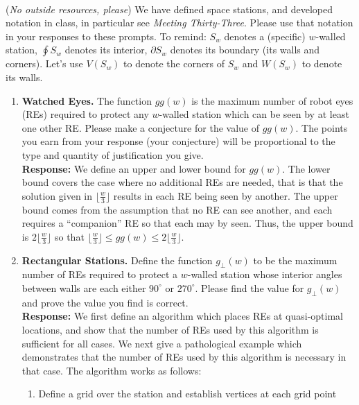 \documentclass{article}
\newcommand{\response}[1]{\leavevmode\\[0.05in]{\bf Response: } #1 \leavevmode\\[0.05in]}
\begin{document}
\noindent \underline{\hspace{5in}}
\vspace{2em}
\\
\noindent(\emph{No outside resources, please}) We have defined space stations, and developed notation in class, in particular see \emph{Meeting Thirty-Three}.  Please use that notation in your responses to these prompts.  To remind: $S_w$ denotes a (specific) $w$-walled station, $\oint S_w$ denotes its interior, $\partial S_w$ denotes its boundary (its walls and corners).  Let's use $V(S_w)$ to denote the corners of $S_w$ and $W(S_w)$ to denote its walls.\\
\begin{enumerate}
	\item {\bf Watched Eyes.} The function $gg(w)$ is the maximum number of robot eyes (REs) required to protect any $w$-walled station which can be seen by at least one other RE.  Please make a conjecture for the value of $gg(w)$.  The points you earn from your response (your conjecture) will be proportional to the type and quantity of justification you give.  
		\response{We define an upper and lower bound for $gg(w)$.  The lower bound covers the case where no additional REs are needed, that is that the solution given in $\lfloor \frac{w}{3} \rfloor$ results in each RE being seen by another.  The upper bound comes from the assumption that no RE can see another, and each requires a ``companion'' RE so that each may by seen.  Thus, the upper bound is $2\lfloor\frac{w}{3}\rfloor$ so that $\lfloor\frac{w}{3}\rfloor \le gg(w) \le 2\lfloor\frac{w}{3}\rfloor$.}
	\item {\bf Rectangular Stations.}  Define the function $g_{\perp}(w)$ to be the maximum number of REs required to protect a $w$-walled station whose interior angles between walls are each either $90^{\circ}$ or $270^{\circ}$.  Please find the value for $g_{\perp}(w)$ and prove the value you find is correct.
		\response{We first define an algorithm which places REs at quasi-optimal locations, and show that the number of REs used by this algorithm is sufficient for all cases.  We next give a pathological example which demonstrates that the number of REs used by this algorithm is necessary in that case. The algorithm works as follows:
		\begin{enumerate}
			\item Define a grid over the station and establish vertices at each grid point

\end{enumerate}}
\end{enumerate}
\end{document}
